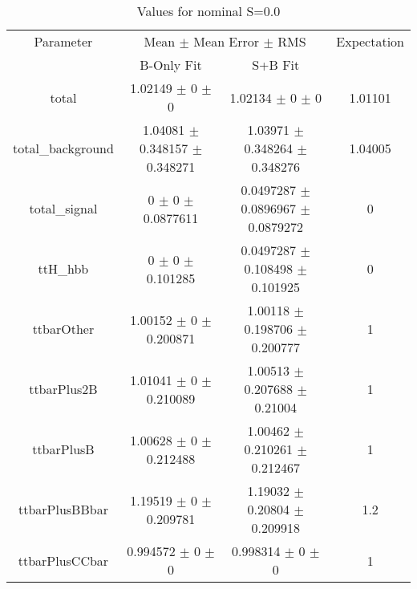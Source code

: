 \begin{table}
\centering
\caption{Values for nominal S=0.0}
\begin{tabular}{cccc}
\toprule
Parameter & \multicolumn{2}{c}{Mean $\pm$ Mean Error $\pm$ RMS} & Expectation\\
 & B-Only Fit & S+B Fit & \\
\midrule
total & \num{1.02149} $\pm$ \num{0} $\pm$ \num{0} & \num{1.02134} $\pm$ \num{0} $\pm$ \num{0} & \num{1.01101}\\
total\_background & \num{1.04081} $\pm$ \num{0.348157} $\pm$ \num{0.348271} & \num{1.03971} $\pm$ \num{0.348264} $\pm$ \num{0.348276} & \num{1.04005}\\
total\_signal & \num{0} $\pm$ \num{0} $\pm$ \num{0.0877611} & \num{0.0497287} $\pm$ \num{0.0896967} $\pm$ \num{0.0879272} & \num{0}\\
ttH\_hbb & \num{0} $\pm$ \num{0} $\pm$ \num{0.101285} & \num{0.0497287} $\pm$ \num{0.108498} $\pm$ \num{0.101925} & \num{0}\\
ttbarOther & \num{1.00152} $\pm$ \num{0} $\pm$ \num{0.200871} & \num{1.00118} $\pm$ \num{0.198706} $\pm$ \num{0.200777} & \num{1}\\
ttbarPlus2B & \num{1.01041} $\pm$ \num{0} $\pm$ \num{0.210089} & \num{1.00513} $\pm$ \num{0.207688} $\pm$ \num{0.21004} & \num{1}\\
ttbarPlusB & \num{1.00628} $\pm$ \num{0} $\pm$ \num{0.212488} & \num{1.00462} $\pm$ \num{0.210261} $\pm$ \num{0.212467} & \num{1}\\
ttbarPlusBBbar & \num{1.19519} $\pm$ \num{0} $\pm$ \num{0.209781} & \num{1.19032} $\pm$ \num{0.20804} $\pm$ \num{0.209918} & \num{1.2}\\
ttbarPlusCCbar & \num{0.994572} $\pm$ \num{0} $\pm$ \num{0} & \num{0.998314} $\pm$ \num{0} $\pm$ \num{0} & \num{1}\\
\bottomrule
\end{tabular}
\end{table}